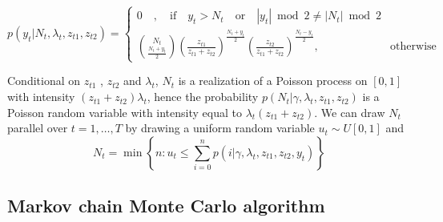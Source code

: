 \documentclass[12pt]{article}
\begin{document}
\begin{equation}
p\left( y_t | N_t, \lambda_t, z_{t1} ,z_{t2}\right) =\begin{cases}
    0\quad,\quad  \text{if}  \quad  y_t > N_t \quad \text{or}\quad |y_t| \bmod 2\neq |N_t| \bmod 2 &    \\
    \displaystyle \binom{N_t}{\frac{N_t+y_t}{2}} \left(\frac{z_{t1} }{z_{t1}+z_{t2}} \right)^{\frac{N_t+y_t}{2}}\left(\frac{z_{t2} }{z_{t1}+z_{t2}} \right)^{\frac{N_t-y_t}{2}} , & \text{otherwise}
  \end{cases}
\end{equation}

 Conditional  on $z_{t1}$ , $z_{t2}$
and  $\lambda_t$, $N_t$ is a realization of a Poisson process on $[0,1]$ with intensity $(z_{t1}+z_{t2})\lambda_t$, hence the probability $p(  N_t| \gamma, \lambda_t ,z_{t1} ,z_{t2}) $  is a Poisson random variable with intensity equal to $\lambda_t ( z_{t1}+z_{t2})$.
We can draw $N_t $ parallel over $t= 1, \ldots, T$ by drawing a uniform random variable $u_t \sim U[0,1]$ and 
\begin{equation}
N_t = \min  \left\{ n : u_t \leq \sum \limits_{i=0}^{n} p( i  | \gamma, \lambda_t ,z_{t1} ,z_{t2}, y_t )  \right\}
\end{equation}

\subsection{Markov chain Monte Carlo algorithm}
\end{document}
